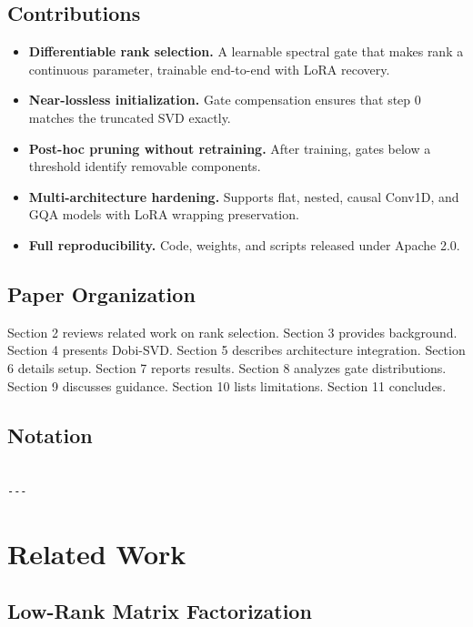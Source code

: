 \subsection{Contributions}

\begin{itemize}
\item \textbf{Differentiable rank selection.} A learnable spectral gate that makes
  rank a continuous parameter, trainable end-to-end with LoRA recovery.
\item \textbf{Near-lossless initialization.} Gate compensation ensures that step 0
  matches the truncated SVD exactly.
\item \textbf{Post-hoc pruning without retraining.} After training, gates below a
  threshold identify removable components.
\item \textbf{Multi-architecture hardening.} Supports flat, nested, causal Conv1D,
  and GQA models with LoRA wrapping preservation.
\item \textbf{Full reproducibility.} Code, weights, and scripts released under
  Apache 2.0.

\end{itemize}
\subsection{Paper Organization}

Section 2 reviews related work on rank selection. Section 3 provides 
background. Section 4 presents Dobi-SVD. Section 5 describes architecture 
integration. Section 6 details setup. Section 7 reports results. Section 8 
analyzes gate distributions. Section 9 discusses guidance. Section 10 lists 
limitations. Section 11 concludes.



\subsection{Notation}

\begin{lstlisting}

---
\end{lstlisting}


\section{Related Work}

\subsection{Low-Rank Matrix Factorization}

